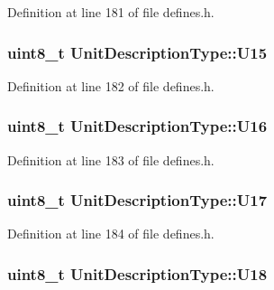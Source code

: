 Definition at line 181 of file defines.\+h.

\subsubsection[{\texorpdfstring{U15}{U15}}]{\setlength{\rightskip}{0pt plus 5cm}uint8\+\_\+t Unit\+Description\+Type\+::\+U15}\hypertarget{structUnitDescriptionType_a67851c4a906293451b0c3e49fe79329c}{}\label{structUnitDescriptionType_a67851c4a906293451b0c3e49fe79329c}


Definition at line 182 of file defines.\+h.

\subsubsection[{\texorpdfstring{U16}{U16}}]{\setlength{\rightskip}{0pt plus 5cm}uint8\+\_\+t Unit\+Description\+Type\+::\+U16}\hypertarget{structUnitDescriptionType_a7ff11ef3bf5d3e485d300dc46bfc06d7}{}\label{structUnitDescriptionType_a7ff11ef3bf5d3e485d300dc46bfc06d7}


Definition at line 183 of file defines.\+h.

\subsubsection[{\texorpdfstring{U17}{U17}}]{\setlength{\rightskip}{0pt plus 5cm}uint8\+\_\+t Unit\+Description\+Type\+::\+U17}\hypertarget{structUnitDescriptionType_a21f0e4e804978c6b29699ae3ed0e5060}{}\label{structUnitDescriptionType_a21f0e4e804978c6b29699ae3ed0e5060}


Definition at line 184 of file defines.\+h.

\subsubsection[{\texorpdfstring{U18}{U18}}]{\setlength{\rightskip}{0pt plus 5cm}uint8\+\_\+t Unit\+Description\+Type\+::\+U18}\hypertarget{structUnitDescriptionType_a5af9c5dc8c43c0c53b847bb0e25d8c18}{}\label{structUnitDescriptionType_a5af9c5dc8c43c0c53b847bb0e25d8c18}


